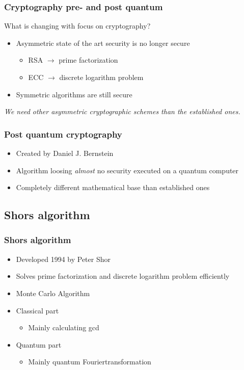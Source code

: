 		\begin{frame}
			\frametitle{Cryptography pre- and post quantum}
			What is changing with focus on cryptography?
			\begin{itemize}
				\item Asymmetric state of the art security is no longer secure
				\begin{itemize}
					\item RSA $\rightarrow$ prime factorization
					\item ECC $\rightarrow$ discrete logarithm problem 
				\end{itemize}
				\item Symmetric algorithms are still secure
			\end{itemize}
			
			\begin{block}{}
				\begin{center}
					\textit{
					We need other asymmetric cryptographic schemes than the established ones.}
				\end{center}
			\end{block}
		\end{frame}
	
		\begin{frame}
			\frametitle{Post quantum cryptography}
			\begin{itemize}
				\item Created by Daniel J. Bernstein
				\item Algorithm loosing \textit{almost} no security executed on a quantum computer
				\item Completely different mathematical base than established ones
			\end{itemize}
		\end{frame}
		
	\subsection{Shors algorithm}
			\begin{frame}
				\frametitle{Shors algorithm}
				\begin{itemize}
					\item Developed 1994 by Peter Shor
					\item Solves prime factorization and discrete logarithm problem efficiently
					\item Monte Carlo Algorithm
					\item Classical part
					\begin{itemize}
						\item Mainly calculating gcd
					\end{itemize}
					\item Quantum part
					\begin{itemize}
						\item Mainly quantum Fouriertransformation
					\end{itemize}
				\end{itemize}
			\end{frame}
			
